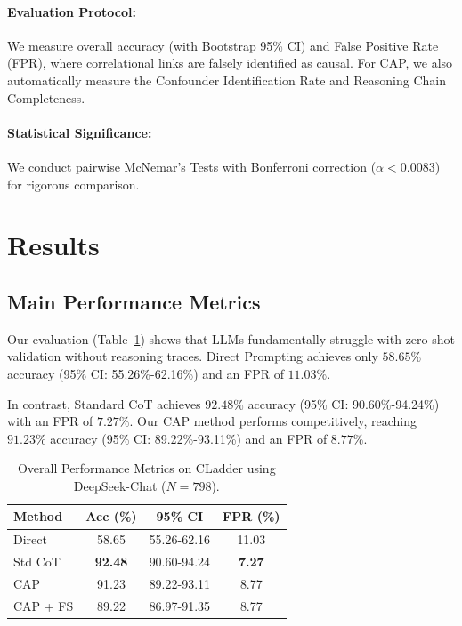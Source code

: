 \documentclass{article}
\theoremstyle{plain}
\theoremstyle{definition}
\theoremstyle{remark}
\begin{document}
\paragraph{Evaluation Protocol:} We measure overall accuracy (with Bootstrap 95\% CI) and False Positive Rate (FPR), where correlational links are falsely identified as causal. For CAP, we also automatically measure the Confounder Identification Rate and Reasoning Chain Completeness.
\paragraph{Statistical Significance:} We conduct pairwise McNemar's Tests with Bonferroni correction ($\alpha < 0.0083$) for rigorous comparison.

\section{Results}

\subsection{Main Performance Metrics}

Our evaluation (Table~\ref{tab:main_results}) shows that LLMs fundamentally struggle with zero-shot validation without reasoning traces. Direct Prompting achieves only $58.65\%$ accuracy (95\% CI: 55.26\%-62.16\%) and an FPR of $11.03\%$. 

In contrast, Standard CoT achieves $92.48\%$ accuracy (95\% CI: 90.60\%-94.24\%) with an FPR of $7.27\%$. Our CAP method performs competitively, reaching $91.23\%$ accuracy (95\% CI: 89.22\%-93.11\%) and an FPR of $8.77\%$. 

\begin{table}[t]
  \caption{Overall Performance Metrics on CLadder using DeepSeek-Chat ($N=798$).}
  \label{tab:main_results}
  \vskip 0.15in
  \begin{center}
  \begin{small}
  \begin{sc}
  \begin{tabular}{lccc}
  \toprule
  Method & Acc (\%) & 95\% CI & FPR (\%) \\
  \midrule
  Direct & 58.65 & 55.26-62.16 & 11.03 \\
  Std CoT & \textbf{92.48} & 90.60-94.24 & \textbf{7.27} \\
  CAP & 91.23 & 89.22-93.11 & 8.77 \\
  CAP + FS & 89.22 & 86.97-91.35 & 8.77 \\
  \bottomrule
  \end{tabular}
  \end{sc}
  \end{small}
  \end{center}
  \vskip -0.1in
\end{table}
\end{document}
